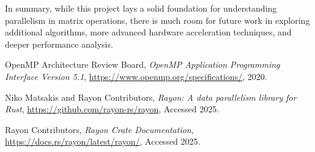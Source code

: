 \documentclass[12pt]{article}
\begin{document}
\vspace{1em}

In summary, while this project lays a solid foundation for understanding parallelism in matrix operations, there is much room for future work in exploring
additional algorithms, more advanced hardware acceleration techniques, and deeper performance analysis.


\newpage
\begin{thebibliography}{9}
    OpenMP Architecture Review Board, \textit{OpenMP Application Programming Interface Version 5.1},
    \url{https://www.openmp.org/specifications/}, 2020.

    Niko Matsakis and Rayon Contributors, \textit{Rayon: A data parallelism library for Rust},
    \url{https://github.com/rayon-rs/rayon}, Accessed 2025.

    Rayon Contributors, \textit{Rayon Crate Documentation}, \url{https://docs.rs/rayon/latest/rayon/}, Accessed 2025.
\end{thebibliography}
\end{document}
